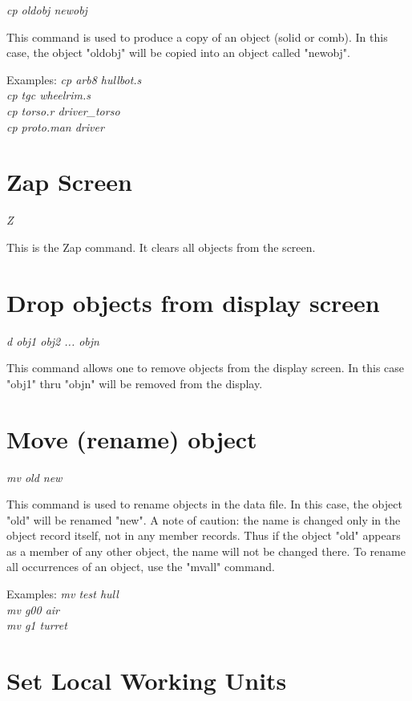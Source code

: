 {\em \center cp oldobj newobj}

This command is used to produce a copy of an object (solid or comb).
In this case, the
object "oldobj" will be copied into an object called "newobj".

Examples:
{\em
              cp arb8 hullbot.s \\
              cp tgc wheelrim.s \\
              cp torso.r driver\_torso \\
              cp proto.man driver \\
}

\section{Zap Screen}

{\em \center Z}

This is the Zap command.  It clears all objects from the screen.

\section{Drop objects from display screen}

{\em \center d obj1 obj2 ... objn}

This command allows one to remove objects from the display screen.  In
this case "obj1" thru "objn" will be removed from the display.

\section{Move (rename) object}

{\em \center mv old new}

This command is used to rename objects in the data file.  In this
case, the object "old" will be renamed "new".
A note of caution:  the name is changed only in the object record itself, not
in any member records.  Thus if the object "old" appears as a member
of any other object, the name will not be changed there.
To rename all occurrences of an object, use the "mvall" command.

Examples:
{\em
              mv test hull \\
              mv g00 air \\
              mv g1 turret \\
}

\section{Set Local Working Units}

